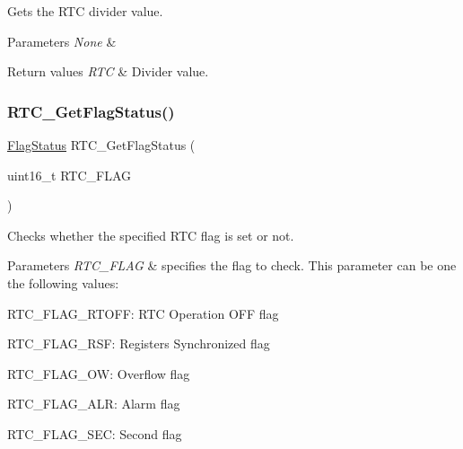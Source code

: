 Gets the R\+TC divider value. 


\begin{DoxyParams}{Parameters}
{\em None} & \\
\hline
\end{DoxyParams}

\begin{DoxyRetVals}{Return values}
{\em R\+TC} & Divider value. \\
\hline
\end{DoxyRetVals}
\mbox{\label{group___r_t_c___private___functions_ga21a85e5f846cb4552d5e76420779f3f6}} 
\subsubsection{\texorpdfstring{RTC\_GetFlagStatus()}{RTC\_GetFlagStatus()}}
{\footnotesize\ttfamily \mbox{\hyperlink{group___exported__types_ga89136caac2e14c55151f527ac02daaff}{Flag\+Status}} R\+T\+C\+\_\+\+Get\+Flag\+Status (\begin{DoxyParamCaption}\item[{uint16\+\_\+t}]{R\+T\+C\+\_\+\+F\+L\+AG }\end{DoxyParamCaption})}



Checks whether the specified R\+TC flag is set or not. 


\begin{DoxyParams}{Parameters}
{\em R\+T\+C\+\_\+\+F\+L\+AG} & specifies the flag to check. This parameter can be one the following values\+: \begin{DoxyItemize}
\item R\+T\+C\+\_\+\+F\+L\+A\+G\+\_\+\+R\+T\+O\+FF\+: R\+TC Operation O\+FF flag \item R\+T\+C\+\_\+\+F\+L\+A\+G\+\_\+\+R\+SF\+: Registers Synchronized flag \item R\+T\+C\+\_\+\+F\+L\+A\+G\+\_\+\+OW\+: Overflow flag \item R\+T\+C\+\_\+\+F\+L\+A\+G\+\_\+\+A\+LR\+: Alarm flag \item R\+T\+C\+\_\+\+F\+L\+A\+G\+\_\+\+S\+EC\+: Second flag \end{DoxyItemize}
\\
\hline
\end{DoxyParams}

